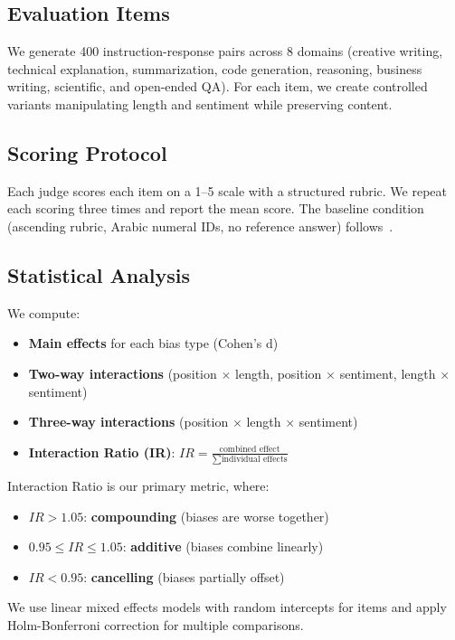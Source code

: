 \documentclass[11pt,twocolumn]{article}
\begin{document}
\subsection{Evaluation Items}
We generate 400 instruction-response pairs across 8 domains (creative writing, technical explanation, summarization, code generation, reasoning, business writing, scientific, and open-ended QA). For each item, we create controlled variants manipulating length and sentiment while preserving content.

\subsection{Scoring Protocol}
Each judge scores each item on a 1--5 scale with a structured rubric. We repeat each scoring three times and report the mean score. The baseline condition (ascending rubric, Arabic numeral IDs, no reference answer) follows~\citet{li2025scoring}.

\subsection{Statistical Analysis}
We compute:
\begin{itemize}
    \item \textbf{Main effects} for each bias type (Cohen's d)
    \item \textbf{Two-way interactions} (position $\times$ length, position $\times$ sentiment, length $\times$ sentiment)
    \item \textbf{Three-way interactions} (position $\times$ length $\times$ sentiment)
    \item \textbf{Interaction Ratio (IR)}: $IR = \frac{\text{combined effect}}{\sum\text{individual effects}}$
\end{itemize}

Interaction Ratio is our primary metric, where:
\begin{itemize}
    \item $IR > 1.05$: \textbf{compounding} (biases are worse together)
    \item $0.95 \leq IR \leq 1.05$: \textbf{additive} (biases combine linearly)
    \item $IR < 0.95$: \textbf{cancelling} (biases partially offset)
\end{itemize}

We use linear mixed effects models with random intercepts for items and apply Holm-Bonferroni correction for multiple comparisons.
\end{document}
